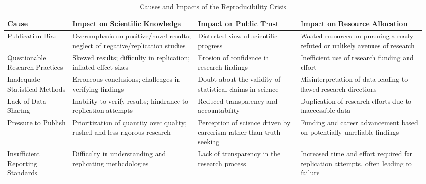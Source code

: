\documentclass{article}
\begin{document}
\begin{table}[ht]
    \centering
    \caption{Causes and Impacts of the Reproducibility Crisis}
    \label{table:reproducibility_crisis} %
    \begin{tabularx}{\textwidth}{|X|X|X|X|}
        \hline
        Cause                                            & Impact on Scientific Knowledge                                                  & Impact on Public Trust                                              & Impact on Resource Allocation                                                                           \\
        \hline
        Publication Bias                                 & Overemphasis on positive/novel results; neglect of negative/replication studies & Distorted view of scientific progress                               & Wasted resources on pursuing already refuted or unlikely avenues of research                            \\
        \hline
        Questionable Research Practices                  & Skewed results; difficulty in replication; inflated effect sizes                & Erosion of confidence in research findings                          & Inefficient use of research funding and effort                                                          \\
        \hline
        Inadequate Statistical Methods                   & Erroneous conclusions; challenges in verifying findings                         & Doubt about the validity of statistical claims in science           & Misinterpretation of data leading to flawed research directions                                         \\
        \hline
        Lack of Data Sharing                             & Inability to verify results; hindrance to replication attempts                  & Reduced transparency and accountability                             & Duplication of research efforts due to inaccessible data                                                \\
        \hline
        Pressure to Publish                              & Prioritization of quantity over quality; rushed and less rigorous research      & Perception of science driven by careerism rather than truth-seeking & Funding and career advancement based on potentially unreliable findings                                 \\
        \hline
        Insufficient Reporting Standards                 & Difficulty in understanding and replicating methodologies                       & Lack of transparency in the research process                        & Increased time and effort required for replication attempts, often leading to failure                   \\

\end{tabularx}
\end{table}
\end{document}
